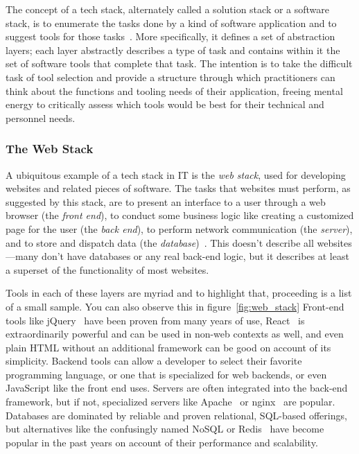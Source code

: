\documentclass[english,12pt,a4paper,pdftex,eng,utf8]{aaltothesis}
\begin{document}
The concept of a tech stack, alternately called a solution stack or a software stack, is to enumerate the tasks done by a kind of software application and to suggest tools for those tasks~\cite{PranamStack2017}.  More specifically, it defines a set of abstraction layers; each layer abstractly describes a type of task and contains within it the set of software tools that complete that task.  The intention is to take the difficult task of tool selection and provide a structure through which practitioners can think about the functions and tooling needs of their application, freeing mental energy to critically assess which tools would be best for their technical and personnel needs.

\subsubsection{The Web Stack}

A ubiquitous example of a tech stack in IT is the {\it web stack}, used for developing websites and related pieces of software.  The tasks that websites must perform, as suggested by this stack, are to present an interface to a user through a web browser (the {\it front end\/}), to conduct some business logic like creating a customized page for the user (the {\it back end\/}), to perform network communication (the {\it server\/}), and to store and dispatch data (the {\it database\/})~\cite{PranamStack2017}.  This doesn't describe all websites---many don't have databases or any real back-end logic, but it describes at least a superset of the functionality of most websites.

Tools in each of these layers are myriad and to highlight that, proceeding is a list of a small sample.  You can also observe this in figure~\ref{fig:web_stack}  Front-end tools like jQuery~\cite{jQuery} have been proven from many years of use, React~\cite{React} is extraordinarily powerful and can be used in non-web contexts as well, and even plain HTML without an additional framework can be good on account of its simplicity.  Backend tools can allow a developer to select their favorite programming language, or one that is specialized for web backends, or even JavaScript like the front end uses.  Servers are often integrated into the back-end framework, but if not, specialized servers like Apache~\cite{ApacheServer} or nginx~\cite{nginx} are popular.  Databases are dominated by reliable and proven relational, SQL-based offerings, but alternatives like the confusingly named NoSQL or Redis~\cite{redis} have become popular in the past years on account of their performance and scalability.
\end{document}
